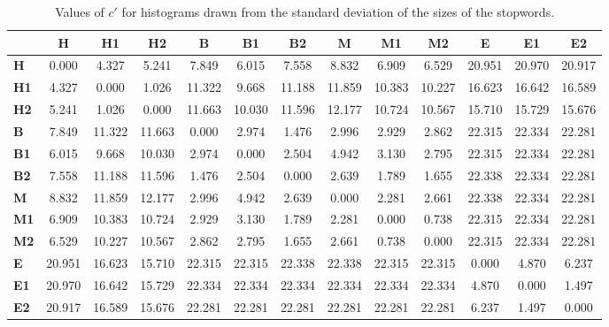 \begin{table*}[h!]
\begin{center}
\begin{tabular}{| l || c | c | c || c | c | c || c | c | c || c | c | c |}\hline
 & {\bf H} & {\bf H1} & {\bf H2} & {\bf B} & {\bf B1} & {\bf B2} & {\bf M} & {\bf M1} & {\bf M2} & {\bf E} & {\bf E1} & {\bf E2} \\\hline\hline
{\bf H} & 0.000 & 4.327 & 5.241 & 7.849 & 6.015 & 7.558 & 8.832 & 6.909 & 6.529 & 20.951 & 20.970 & 20.917 \\\hline
{\bf H1} & 4.327 & 0.000 & 1.026 & 11.322 & 9.668 & 11.188 & 11.859 & 10.383 & 10.227 & 16.623 & 16.642 & 16.589 \\\hline
{\bf H2} & 5.241 & 1.026 & 0.000 & 11.663 & 10.030 & 11.596 & 12.177 & 10.724 & 10.567 & 15.710 & 15.729 & 15.676 \\\hline\hline
{\bf B} & 7.849 & 11.322 & 11.663 & 0.000 & 2.974 & 1.476 & 2.996 & 2.929 & 2.862 & 22.315 & 22.334 & 22.281 \\\hline
{\bf B1} & 6.015 & 9.668 & 10.030 & 2.974 & 0.000 & 2.504 & 4.942 & 3.130 & 2.795 & 22.315 & 22.334 & 22.281 \\\hline
{\bf B2} & 7.558 & 11.188 & 11.596 & 1.476 & 2.504 & 0.000 & 2.639 & 1.789 & 1.655 & 22.338 & 22.334 & 22.281 \\\hline\hline
{\bf M} & 8.832 & 11.859 & 12.177 & 2.996 & 4.942 & 2.639 & 0.000 & 2.281 & 2.661 & 22.338 & 22.334 & 22.281 \\\hline
{\bf M1} & 6.909 & 10.383 & 10.724 & 2.929 & 3.130 & 1.789 & 2.281 & 0.000 & 0.738 & 22.315 & 22.334 & 22.281 \\\hline
{\bf M2} & 6.529 & 10.227 & 10.567 & 2.862 & 2.795 & 1.655 & 2.661 & 0.738 & 0.000 & 22.315 & 22.334 & 22.281 \\\hline\hline
{\bf E} & 20.951 & 16.623 & 15.710 & 22.315 & 22.315 & 22.338 & 22.338 & 22.315 & 22.315 & 0.000 & 4.870 & 6.237 \\\hline
{\bf E1} & 20.970 & 16.642 & 15.729 & 22.334 & 22.334 & 22.334 & 22.334 & 22.334 & 22.334 & 4.870 & 0.000 & 1.497 \\\hline
{\bf E2} & 20.917 & 16.589 & 15.676 & 22.281 & 22.281 & 22.281 & 22.281 & 22.281 & 22.281 & 6.237 & 1.497 & 0.000 \\\hline
\end{tabular}
\caption{Values of $c'$ for histograms drawn from the standard deviation of the sizes of the stopwords.}
\end{center}
\end{table*}
